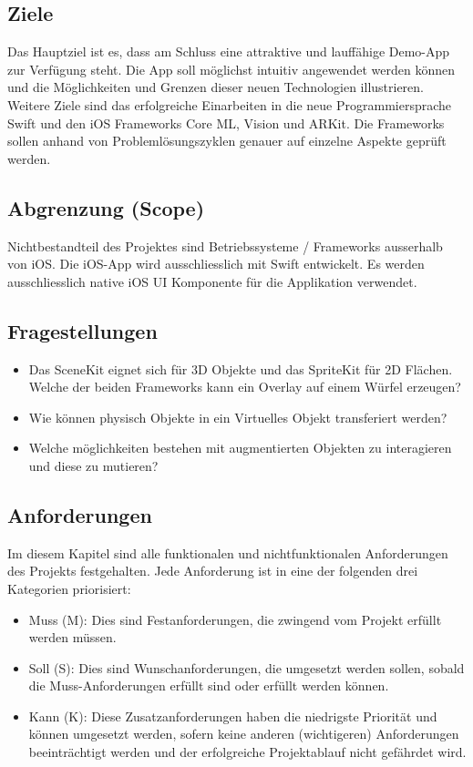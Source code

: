 \subsection{Ziele}
Das Hauptziel ist es, dass am Schluss eine attraktive und lauffähige Demo-App zur Verfügung steht. Die App soll möglichst intuitiv angewendet werden können und die Möglichkeiten und Grenzen dieser neuen Technologien illustrieren. Weitere Ziele sind das erfolgreiche Einarbeiten in die neue Programmiersprache Swift und den iOS Frameworks Core ML, Vision und ARKit. Die Frameworks sollen anhand von Problemlösungszyklen genauer auf einzelne Aspekte geprüft werden.

\subsection{Abgrenzung (Scope)}
Nichtbestandteil des Projektes sind Betriebssysteme / Frameworks ausserhalb von iOS. Die iOS-App wird ausschliesslich mit Swift entwickelt. Es werden ausschliesslich native iOS UI Komponente für die Applikation verwendet.

\subsection{Fragestellungen}
\begin{itemize}
	\item Das SceneKit eignet sich für 3D Objekte und das SpriteKit für 2D Flächen. Welche der beiden Frameworks kann ein Overlay auf einem Würfel erzeugen?
	\item Wie können physisch Objekte in ein Virtuelles Objekt transferiert werden?
	\item Welche möglichkeiten bestehen mit augmentierten Objekten zu interagieren und diese zu mutieren?
\end{itemize}

\subsection{Anforderungen}
Im diesem Kapitel sind alle funktionalen und nichtfunktionalen Anforderungen des Projekts festgehalten. Jede Anforderung ist in eine der folgenden drei Kategorien priorisiert:
\begin{itemize}
	\item Muss (M): Dies sind Festanforderungen, die zwingend vom Projekt erfüllt werden müssen.
	\item Soll (S): Dies sind Wunschanforderungen, die umgesetzt werden sollen, sobald die Muss-Anforderungen erfüllt sind oder erfüllt werden können.
	\item Kann (K): Diese Zusatzanforderungen haben die niedrigste Priorität und können umgesetzt werden, sofern keine anderen (wichtigeren) Anforderungen beeinträchtigt werden und der erfolgreiche Projektablauf nicht gefährdet wird.
\end{itemize}

